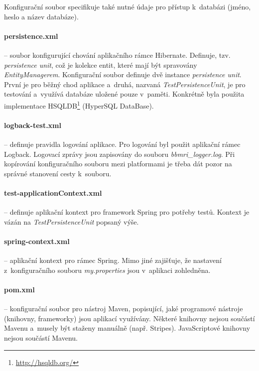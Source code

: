 \documentclass[11pt, final, oneside]{fithesis2}
\begin{document}
Konfigurační soubor specifikuje také nutné údaje pro přístup k~databázi (jméno, heslo a název databáze).

\paragraph*{persistence.xml} -- soubor konfigurující chování aplikačního rámce Hibernate. Definuje, tzv. \textit{persistence unit}, což je kolekce entit, které mají být spravovány \textit{EntityManagerem}.
Konfigurační soubor definuje dvě instance \textit{persistence unit}. První je pro běžný chod aplikace a~druhá, nazvaná \textit{TestPersistenceUnit}, je pro testování a~využívá databáze uložené pouze v~paměti.
Konkrétně byla použita implementace HSQLDB\footnote{\url{http://hsqldb.org/}} (HyperSQL DataBase).

\paragraph*{logback-test.xml} -- definuje pravidla logování aplikace. Pro logování byl použit aplikační rámec Logback. Logovací zprávy jsou zapisovány do souboru \textit{bbmri\_logger.log}. Při kopírování konfiguračního souboru mezi platformami je třeba dát pozor na správné stanovení cesty k~souboru.

\paragraph*{test-applicationContext.xml} -- definuje aplikační kontext pro framework Spring pro potřeby testů. Kontext je vázán na \textit{TestPersistenceUnit} popsaný výše.

\paragraph*{spring-context.xml} -- aplikační kontext pro rámec Spring. Mimo jiné zajišťuje, že nastavení z~konfiguračního souboru \textit{my.properties} jsou v~aplikaci zohledněna.

\paragraph*{pom.xml} -- konfigurační soubor pro nástroj Maven, popisující, jaké programové nástroje (knihovny, frameworky) jsou aplikací využívány. Některé knihovny nejsou součástí Mavenu a~musely být staženy manuálně (např. Stripes). JavaScriptové knihovny nejsou součástí Mavenu.
\end{document}
